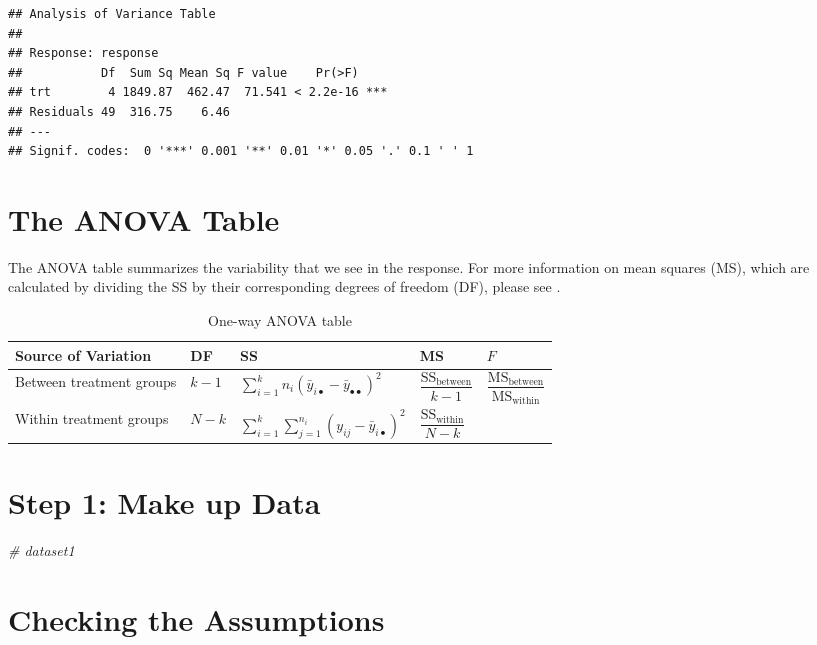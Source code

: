 \documentclass[
]{book}
\newenvironment{Shaded}{\begin{snugshade}}{\end{snugshade}}
\newcommand{\CommentTok}[1]{\textcolor[rgb]{0.56,0.35,0.01}{\textit{#1}}}
\begin{document}
\begin{verbatim}
## Analysis of Variance Table
## 
## Response: response
##           Df  Sum Sq Mean Sq F value    Pr(>F)    
## trt        4 1849.87  462.47  71.541 < 2.2e-16 ***
## Residuals 49  316.75    6.46                      
## ---
## Signif. codes:  0 '***' 0.001 '**' 0.01 '*' 0.05 '.' 0.1 ' ' 1
\end{verbatim}

\hypertarget{the-anova-table}{%
\section{The ANOVA Table}\label{the-anova-table}}

The ANOVA table summarizes the variability that we see in the response. For more information on mean squares (MS), which are calculated by dividing the SS by their corresponding degrees of freedom (DF), please see \autocite{MS-Interpretation}.

\begin{table}[H]
\caption{One-way ANOVA table}
\begin{tabular}{M{0.15\textwidth} l l l l}
\toprule
Source of Variation & DF & SS & MS & \(F\) \\
\midrule
Between treatment groups & \(k - 1\) & \(\sum_{i=1}^{k} n_i\left( \bar{y}_{i \bullet} - \bar{y}_{\bullet\bullet} \right)^2\) & \(\dfrac{\text{SS}_{\text{between}}}{k - 1}\) & \(\dfrac{\text{MS}_{\text{between}}}{\text{MS}_{\text{within}}}\) \\
\addlinespace[0.5cm]
Within treatment groups & \(N - k\) & \(\sum_{i=1}^{k} \sum_{j = 1}^{n_i} \left(y_{ij} - \bar{y}_{i \bullet} \right)^2\) & \(\dfrac{\text{SS}_{\text{within}}}{N - k}\) \\
\bottomrule
\end{tabular}
\end{table}

\hypertarget{step-1-make-up-data}{%
\section{Step 1: Make up Data}\label{step-1-make-up-data}}

\begin{Shaded}
\begin{Highlighting}[]
\CommentTok{\# dataset1}
\end{Highlighting}
\end{Shaded}

\hypertarget{checking-the-assumptions}{%
\section{Checking the Assumptions}\label{checking-the-assumptions}}
\end{document}
